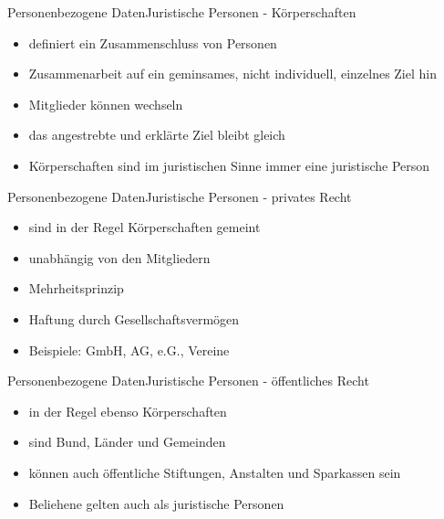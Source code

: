 \documentclass[9pt]{beamer}
\begin{document}
        \begin{frame}{Personenbezogene Daten}{Juristische Personen - Körperschaften}
                \begin{itemize}
            		\item definiert ein Zusammenschluss von Personen
            		\item Zusammenarbeit auf ein geminsames, nicht individuell, einzelnes Ziel hin
            		\item Mitglieder können wechseln
            		\item das angestrebte und erklärte Ziel bleibt gleich
            		\item Körperschaften sind im juristischen Sinne immer eine juristische Person
            	\end{itemize}
            \end{frame}

        \begin{frame}{Personenbezogene Daten}{Juristische Personen - privates Recht}
                \begin{itemize}
            		\item sind in der Regel Körperschaften gemeint
            		\item unabhängig von den Mitgliedern
            		\item Mehrheitsprinzip
            		\item Haftung durch Gesellschaftsvermögen
            		\item Beispiele: GmbH, AG, e.G., Vereine
            	\end{itemize}
            \end{frame}

            \begin{frame}{Personenbezogene Daten}{Juristische Personen - öffentliches Recht}
                    \begin{itemize}
                		\item in der Regel ebenso Körperschaften
                		\item sind Bund, Länder und Gemeinden
                		\item können auch öffentliche Stiftungen, Anstalten und Sparkassen sein
                		\item Beliehene gelten auch als juristische Personen
                	\end{itemize}
                \end{frame}
\end{document}
